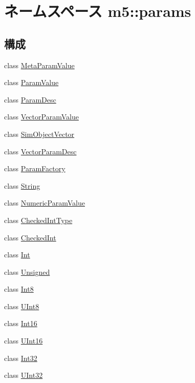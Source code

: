 \hypertarget{namespacem5_1_1params}{
\section{ネームスペース m5::params}
\label{namespacem5_1_1params}
}
\subsection*{構成}
\begin{DoxyCompactItemize}
\item 
class \hyperlink{classm5_1_1params_1_1MetaParamValue}{MetaParamValue}
\item 
class \hyperlink{classm5_1_1params_1_1ParamValue}{ParamValue}
\item 
class \hyperlink{classm5_1_1params_1_1ParamDesc}{ParamDesc}
\item 
class \hyperlink{classm5_1_1params_1_1VectorParamValue}{VectorParamValue}
\item 
class \hyperlink{classm5_1_1params_1_1SimObjectVector}{SimObjectVector}
\item 
class \hyperlink{classm5_1_1params_1_1VectorParamDesc}{VectorParamDesc}
\item 
class \hyperlink{classm5_1_1params_1_1ParamFactory}{ParamFactory}
\item 
class \hyperlink{classm5_1_1params_1_1String}{String}
\item 
class \hyperlink{classm5_1_1params_1_1NumericParamValue}{NumericParamValue}
\item 
class \hyperlink{classm5_1_1params_1_1CheckedIntType}{CheckedIntType}
\item 
class \hyperlink{classm5_1_1params_1_1CheckedInt}{CheckedInt}
\item 
class \hyperlink{classm5_1_1params_1_1Int}{Int}
\item 
class \hyperlink{classm5_1_1params_1_1Unsigned}{Unsigned}
\item 
class \hyperlink{classm5_1_1params_1_1Int8}{Int8}
\item 
class \hyperlink{classm5_1_1params_1_1UInt8}{UInt8}
\item 
class \hyperlink{classm5_1_1params_1_1Int16}{Int16}
\item 
class \hyperlink{classm5_1_1params_1_1UInt16}{UInt16}
\item 
class \hyperlink{classm5_1_1params_1_1Int32}{Int32}
\item 
class \hyperlink{classm5_1_1params_1_1UInt32}{UInt32}
\item 

\end{DoxyCompactItemize}
